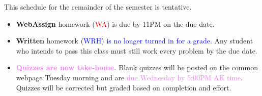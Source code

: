 \documentclass[11pt]{article}
\begin{document}
\thispagestyle{fancy}


\begin{center} This schedule for the remainder of the semester is tentative. \end{center}


\begin{itemize}
\item \textbf{WebAssign} homework (\textcolor{red}{WA}) is due by 11PM on the due date. 
\item \textbf{Written} homework (\textcolor{blue}{WRH}) \textcolor{blue}{is no longer turned in for a grade.} Any student who intends to pass this class must still work every problem by the due date.
\item \textcolor{violet}{\textbf{Quizzes are now take-home.} }Blank quizzes will be posted on the common webpage Tuesday morning and are \textcolor{violet}{due Wednesday by 5:00PM AK time}. Quizzes will be corrected but graded based on completion and effort.\end{itemize}
\end{document}

